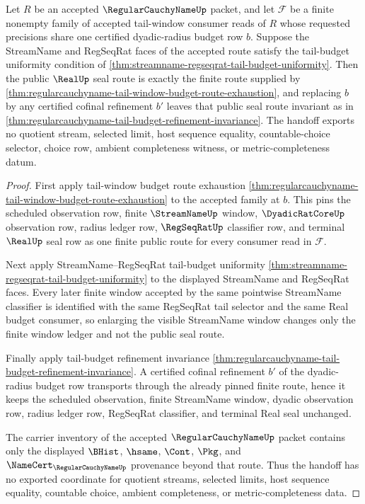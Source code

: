 \begin{theorem}
\label{thm:regularcauchyname-tail-budget-streamname-regseqrat-handoff}
Let $R$ be an accepted $\RegularCauchyNameUp$ packet, and let $\mathcal{F}$ be a finite nonempty family of accepted tail-window consumer reads of $R$ whose requested precisions share one certified dyadic-radius budget row $b$. Suppose the StreamName and RegSeqRat faces of the accepted route satisfy the tail-budget uniformity condition of \autoref{thm:streamname-regseqrat-tail-budget-uniformity}. Then the public $\RealUp$ seal route is exactly the finite route supplied by \autoref{thm:regularcauchyname-tail-window-budget-route-exhaustion}, and replacing $b$ by any certified cofinal refinement $b'$ leaves that public seal route invariant as in \autoref{thm:regularcauchyname-tail-budget-refinement-invariance}. The handoff exports no quotient stream, selected limit, host sequence equality, countable-choice selector, choice row, ambient completeness witness, or metric-completeness datum.
\end{theorem}
\begin{proof}
First apply tail-window budget route exhaustion \autoref{thm:regularcauchyname-tail-window-budget-route-exhaustion} to the accepted family at $b$. This pins the scheduled observation row, finite $\StreamNameUp$ window, $\DyadicRatCoreUp$ observation row, radius ledger row, $\RegSeqRatUp$ classifier row, and terminal $\RealUp$ seal row as one finite public route for every consumer read in $\mathcal{F}$.

Next apply StreamName--RegSeqRat tail-budget uniformity \autoref{thm:streamname-regseqrat-tail-budget-uniformity} to the displayed StreamName and RegSeqRat faces. Every later finite window accepted by the same pointwise StreamName classifier is identified with the same RegSeqRat tail selector and the same Real budget consumer, so enlarging the visible StreamName window changes only the finite window ledger and not the public seal route.

Finally apply tail-budget refinement invariance \autoref{thm:regularcauchyname-tail-budget-refinement-invariance}. A certified cofinal refinement $b'$ of the dyadic-radius budget row transports through the already pinned finite route, hence it keeps the scheduled observation, finite StreamName window, dyadic observation row, radius ledger row, RegSeqRat classifier, and terminal Real seal unchanged.

The carrier inventory of the accepted $\RegularCauchyNameUp$ packet contains only the displayed $\BHist$, $\hsame$, $\Cont$, $\Pkg$, and $\NameCert_{\RegularCauchyNameUp}$ provenance beyond that route. Thus the handoff has no exported coordinate for quotient streams, selected limits, host sequence equality, countable choice, ambient completeness, or metric-completeness data.
\end{proof}
